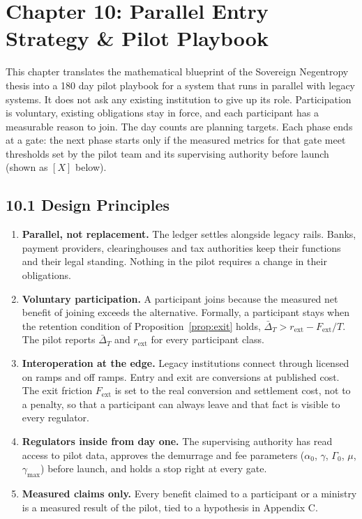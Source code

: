 \documentclass[11pt,a4paper]{article}
\theoremstyle{definition}
\theoremstyle{plain}
\theoremstyle{remark}
\begin{document}
\section*{Chapter 10: Parallel Entry Strategy \& Pilot Playbook}
This chapter translates the mathematical blueprint of the Sovereign Negentropy thesis into a 180 day pilot playbook for a system that runs in parallel with legacy systems. It does not ask any existing institution to give up its role. Participation is voluntary, existing obligations stay in force, and each participant has a measurable reason to join. The day counts are planning targets. Each phase ends at a gate: the next phase starts only if the measured metrics for that gate meet thresholds set by the pilot team and its supervising authority before launch (shown as $[X]$ below).

\subsection*{10.1 Design Principles}
\begin{enumerate}
\item \textbf{Parallel, not replacement.} The ledger settles alongside legacy rails. Banks, payment providers, clearinghouses and tax authorities keep their functions and their legal standing. Nothing in the pilot requires a change in their obligations.
\item \textbf{Voluntary participation.} A participant joins because the measured net benefit of joining exceeds the alternative. Formally, a participant stays when the retention condition of Proposition~\ref{prop:exit} holds, $\bar\Delta_T > r_{\mathrm{ext}} - F_{\mathrm{ext}}/T$. The pilot reports $\bar\Delta_T$ and $r_{\mathrm{ext}}$ for every participant class.
\item \textbf{Interoperation at the edge.} Legacy institutions connect through licensed on ramps and off ramps. Entry and exit are conversions at published cost. The exit friction $F_{\mathrm{ext}}$ is set to the real conversion and settlement cost, not to a penalty, so that a participant can always leave and that fact is visible to every regulator.
\item \textbf{Regulators inside from day one.} The supervising authority has read access to pilot data, approves the demurrage and fee parameters ($\alpha_0$, $\gamma$, $\Gamma_0$, $\mu$, $\gamma_{\max}$) before launch, and holds a stop right at every gate.
\item \textbf{Measured claims only.} Every benefit claimed to a participant or a ministry is a measured result of the pilot, tied to a hypothesis in Appendix C.
\end{enumerate}
\end{document}
